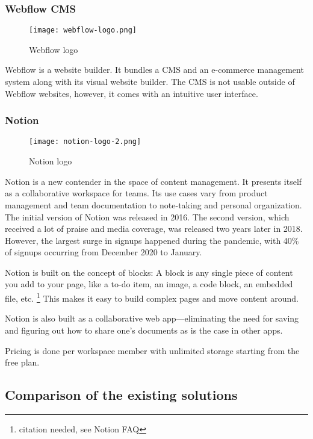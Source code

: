 \subsubsection{Webflow CMS}

\begin{figure}[h]
	\centering
	\texttt{[image: webflow-logo.png]}
	\caption{Webflow logo}
\end{figure}

Webflow is a website builder. It bundles a CMS and an e-commerce
management system along with its visual website builder. The CMS is not
usable outside of Webflow websites, however, it comes with an intuitive
user interface.

\subsubsection{Notion}

\begin{figure}[h]
	\centering
	\texttt{[image: notion-logo-2.png]}
	\caption{Notion logo}
\end{figure}

Notion is a new contender in the space of content management. It
presents itself as a collaborative workspace for teams. Its use cases
vary from product management and team documentation to note-taking and
personal organization. The initial version of Notion was released in
2016. The second version, which received a lot of praise and media
coverage, was released two years later in 2018. However, the largest
surge in signups happened during the pandemic, with 40\% of signups
occurring from December 2020 to January.

Notion is built on the concept of blocks: A block is any single piece
of content you add to your page, like a to-do item, an image, a code
block, an embedded file, etc. \footnote{citation needed, see Notion FAQ}
This makes it easy to build complex pages and move content around.

Notion is also built as a collaborative web app---eliminating the need
for saving and figuring out how to share one's documents as is the case
in other apps.

Pricing is done per workspace member with unlimited storage starting
from the free plan.

\subsection{Comparison of the existing solutions}

